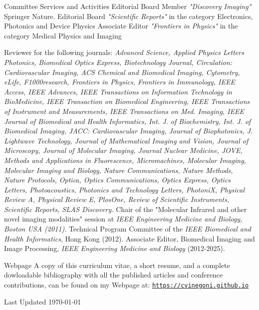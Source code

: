 \documentclass{resume}
\begin{document}
%
%
\begin{category}{Committee Services and Activities}
\citembullet 
Editorial Board Member {\it "Discovery Imaging"} Springer Nature.
\citembullet 
Editorial Board {\it "Scientific Reports"} in the category Electronics, Photonics and Device Physics
\citembullet 
Associate Editor {\it "Frontiers in Physics"} in the category Medical Physics and Imaging

\citembullet 
Reviewer for the following journals: {\it Advanced Science, Applied Physics Letters Photonics, Biomedical Optics Express, Biotechnology Journal, Circulation: Cardiovascular Imaging, ACS Chemical and Biomedical Imaging, Cytometry, eLife, F1000research, Frontiers in Physics, Frontiers in Immunology, IEEE Access, IEEE Advances, IEEE Transactions on Information Technology in BioMedicine,  IEEE Transaction on Biomedical Engineering, IEEE Transactions of Instrument and Measurements, IEEE Transactions on Med. Imaging,  IEEE Journal of Biomedical and Health Informatics, Int. J. of Biochemistry, Int. J. of Biomedical Imaging, JACC: Cardiovascular Imaging, Journal of Biophotonics, J. Lightwave Technology, Journal of Mathematical Imaging and Vision, Journal of Microscopy, Journal of Molecular Imaging, Journal Nuclear Medicine, JOVE,  Methods and Applications in Fluorescence, Micromachines, Molecular Imaging, Molecular Imaging and Biology, Nature Communications, Nature Methods, Nature Protocols, Optica, Optics Communications, Optics Express, Optics Letters, Photoacoustics, Photonics and Technology Letters, PhotoniX, Physical Review A, Physical Review E, PlosOne, Review of Scientific Instruments, Scientific Reports, SLAS Discovery.}
\citembullet 
Chair of the "Molecular Infrared and other novel imaging modalities" session at {\it IEEE Engineering Medicine and Biology, Boston USA (2011).}
\citembullet 
Technical Program Committee of the {\it IEEE Biomedical and Health Informatics}, Hong Kong (2012).
\citembullet 
Associate Editor, Biomedical Imaging and Image Processing, {\it IEEE Engineering Medicine and Biology} (2012-2025).
\end{category}

\begin{category}{Webpage}
 \citemnobullet 
A copy of this curriculum vitae, a short
resume, and a complete dowloadable bibliography with all the
published articles and conference contributions, can be found on my Webpage at:
\newline
    \mbox{\small\tt \url{https://cvinegoni.github.io}}
\end{category}

\begin{category}{Last Updated}
\citemnobullet 
\today{}
\end{category}

\end{document}
